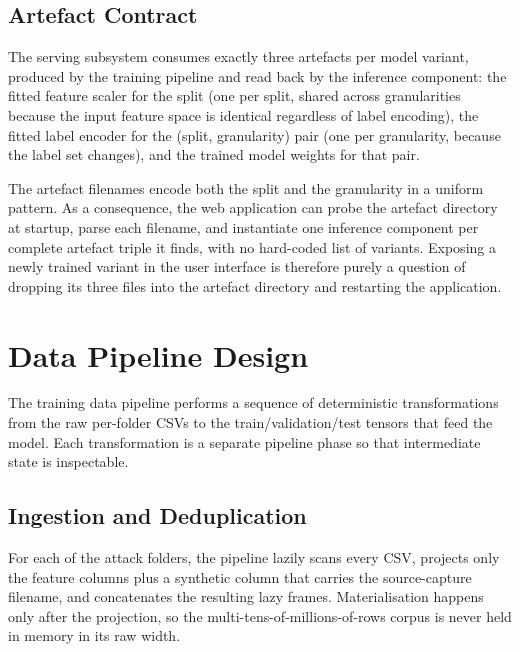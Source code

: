 \subsection{Artefact Contract}
\label{subsec:artefact_contract}

\par The serving subsystem consumes exactly three artefacts per model variant, produced by the training pipeline and read back by the inference component: the fitted feature scaler for the split (one per split, shared across granularities because the input feature space is identical regardless of label encoding), the fitted label encoder for the (split, granularity) pair (one per granularity, because the label set changes), and the trained model weights for that pair.

\par The artefact filenames encode both the split and the granularity in a uniform pattern. As a consequence, the web application can probe the artefact directory at startup, parse each filename, and instantiate one inference component per complete artefact triple it finds, with no hard-coded list of variants. Exposing a newly trained variant in the user interface is therefore purely a question of dropping its three files into the artefact directory and restarting the application.

\section{Data Pipeline Design}
\label{sec:data_pipeline_design}

\par The training data pipeline performs a sequence of deterministic transformations from the raw per-folder CSVs to the train/validation/test tensors that feed the model. Each transformation is a separate pipeline phase so that intermediate state is inspectable.

\subsection{Ingestion and Deduplication}
\label{subsec:ingestion}

\par For each of the attack folders, the pipeline lazily scans every CSV, projects only the feature columns plus a synthetic column that carries the source-capture filename, and concatenates the resulting lazy frames. Materialisation happens only after the projection, so the multi-tens-of-millions-of-rows corpus is never held in memory in its raw width.

